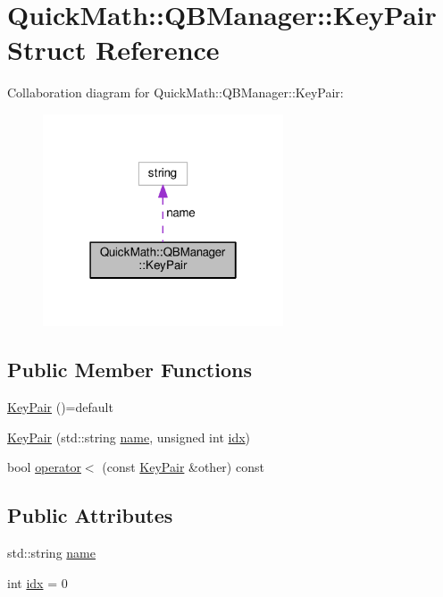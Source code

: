 \hypertarget{structQuickMath_1_1QBManager_1_1KeyPair}{}\section{Quick\+Math\+:\+:Q\+B\+Manager\+:\+:Key\+Pair Struct Reference}
\label{structQuickMath_1_1QBManager_1_1KeyPair}


Collaboration diagram for Quick\+Math\+:\+:Q\+B\+Manager\+:\+:Key\+Pair\+:
\nopagebreak
\begin{figure}[H]
\begin{center}
\leavevmode
\includegraphics[width=202pt]{structQuickMath_1_1QBManager_1_1KeyPair__coll__graph}
\end{center}
\end{figure}
\subsection*{Public Member Functions}
\begin{DoxyCompactItemize}
\item 
\hyperlink{structQuickMath_1_1QBManager_1_1KeyPair_a1a0c2d088d2a4bc3eea9fc78a349db24}{Key\+Pair} ()=default
\item 
\hyperlink{structQuickMath_1_1QBManager_1_1KeyPair_a855867a1bc271998f22c91e683c49c79}{Key\+Pair} (std\+::string \hyperlink{structQuickMath_1_1QBManager_1_1KeyPair_a037ae369491b33991f062884f5f91c95}{name}, unsigned int \hyperlink{structQuickMath_1_1QBManager_1_1KeyPair_ab7f95fb28b5564fc80f6fa6923f22d5b}{idx})
\item 
bool \hyperlink{structQuickMath_1_1QBManager_1_1KeyPair_ab11227be6b4ff77384a916bedb7db6aa}{operator$<$} (const \hyperlink{structQuickMath_1_1QBManager_1_1KeyPair}{Key\+Pair} \&other) const 
\end{DoxyCompactItemize}
\subsection*{Public Attributes}
\begin{DoxyCompactItemize}
\item 
std\+::string \hyperlink{structQuickMath_1_1QBManager_1_1KeyPair_a037ae369491b33991f062884f5f91c95}{name}
\item 
int \hyperlink{structQuickMath_1_1QBManager_1_1KeyPair_ab7f95fb28b5564fc80f6fa6923f22d5b}{idx} = 0
\end{DoxyCompactItemize}


